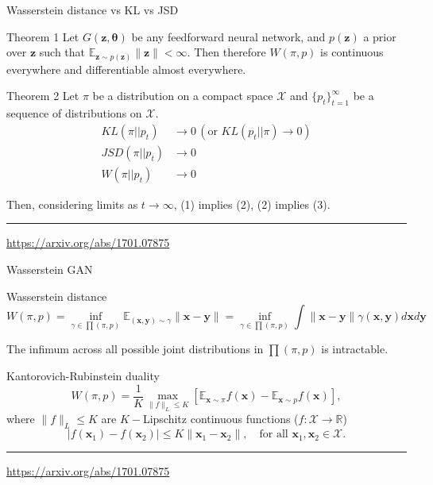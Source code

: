 \documentclass{beamer}
\newcommand{\bx}{\mathbf{x}}
\newcommand{\bz}{\mathbf{z}}
\newcommand{\by}{\mathbf{y}}
\newcommand{\bbE}{\mathbb{E}}
\newcommand{\bbR}{\mathbb{R}}
\newcommand{\cX}{\mathcal{X}}
\newcommand{\btheta}{\boldsymbol{\theta}}
\begin{document}
\begin{frame}{Wasserstein distance vs KL vs JSD}
	\begin{block}{Theorem 1}
		Let $G(\bz, \btheta)$ be any feedforward neural network, and $p(\bz)$ a prior over $\bz$ such that $\bbE_{\bz \sim p(\bz)}
		\|\bz\| < \infty$. Then therefore $W(\pi, p)$ is continuous everywhere and differentiable almost everywhere.
	\end{block}
	\begin{block}{Theorem 2}
		Let $\pi$ be a distribution on a compact space $\cX$ and $\{p_t\}_{t=1}^\infty$ be a sequence of distributions on $\cX$. 
		\begin{align}
			KL(\pi || p_t) &\rightarrow 0 \, (\text{or }KL (p_t || \pi) \rightarrow 0) \\
			JSD(\pi || p_t) &\rightarrow 0 \\
			W(\pi || p_t) &\rightarrow 0
		\end{align}
		
		Then, considering limits as $t \rightarrow \infty$, (1) implies (2), (2) implies (3).
	\end{block}
	\vfill
	\hrule\medskip 
	{\scriptsize \href{https://arxiv.org/abs/1701.07875}{https://arxiv.org/abs/1701.07875}}
\end{frame}
\begin{frame}{Wasserstein GAN}
	\begin{block}{Wasserstein distance}
		\vspace{-0.4cm}
		\[
			W(\pi, p) = \inf_{\gamma \in \prod(\pi, p)} \bbE_{(\bx, \by) \sim \gamma} \| \bx - \by \| =  \inf_{\gamma \in \prod(\pi, p)} \int \| \bx - \by \| \gamma (\bx, \by) d \bx d \by
		\]
	\end{block}
	The infimum across all possible joint distributions in $\prod(\pi, p)$ is intractable.
	\begin{block}{Kantorovich-Rubinstein duality}
		\[
			W(\pi, p) = \frac{1}{K} \max_{\| f \|_L \leq K} \left[ \bbE_{\bx \sim \pi} f(\bx)  - \bbE_{\bx \sim p} f(\bx)\right],
		\]
		where $\| f \|_L \leq K$ are $K-$Lipschitz continuous functions ($f: \cX \rightarrow \bbR$)
		\[
			|f(\bx_1) - f(\bx_2)| \leq K \| \bx_1 - \bx_2 \|, \quad \text{for all } \bx_1, \bx_2 \in \cX.
		\]
	\end{block}
	\vfill
	\hrule\medskip 
	{\scriptsize \href{https://arxiv.org/abs/1701.07875}{https://arxiv.org/abs/1701.07875}}
\end{frame}
\end{document}
